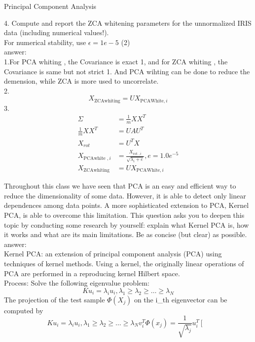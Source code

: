 \documentclass[
	ngerman,
     solution=true
	]{tudaexercise}
\begin{document}
\begin{task}{Principal Component Analysis}
\begin{subtask}[3e)]
4. Compute and report the ZCA whitening parameters for the unnormalized IRIS data (including numerical values!).\\
For numerical stability, use $\epsilon=1 e-5$ (2)\\[15pt]
answer:\\[15pt]
1.For PCA whiting , the Covariance is exact 1, and for ZCA whiting , the Covariance is same but not strict 1.
And PCA wihting can be done to reduce the demension, while ZCA is more used to uncorrelate.\\
2.
\[
X_{\text {ZCAwhiting}}=U X_{\text {PCAWhite}, i}
\]
3.
\[
\begin{aligned}
\Sigma &= \frac{1}{m} X X^{T}\\
\frac{1}{m} X X^{T} &=U A U^{T}\\
X_{r o t}&=U^{T} X \\
X_{\text {PCAwhite }, i} & =\frac{X_{\text {rot }, i}}{\sqrt{\lambda_{i}+e}}, e=1.0 e^{-5}\\
X_{\text {ZCAwhiting}}&=U X_{\text {PCAWhite}, i}
\end{aligned}
\]
\end{subtask}
\begin{subtask}[3f)]
Throughout this class we have seen that PCA is an easy and efficient way to reduce the dimensionality of
some data. However, it is able to detect only linear dependences among data points. A more sophisticated
extension to PCA, Kernel PCA, is able to overcome this limitation. This question asks you to deepen this topic
by conducting some research by yourself: explain what Kernel PCA is, how it works and what are its main
limitations. Be as concise (but clear) as possible.\\[15pt]
answer:\\[15pt]
Kernel PCA: an extension of principal component analysis (PCA) using techniques of kernel methods. Using a kernel, the originally linear operations of PCA are performed in a reproducing kernel Hilbert space.\\
Process: Solve the following eigenvalue problem:\\
\[
K u_{i}=\lambda_{i} u_{i}, \lambda_{1} \geq \lambda_{2} \geq \ldots \geq \lambda_{N}
\]
The projection of the test sample $\Phi (X_j)$ on the i\_th eigenvector can be computed by
\[
K u_{i}=\lambda_{i} u_{i}, \lambda_{1} \geq \lambda_{2} \geq \ldots \geq \lambda_{N}v_{i}^{T} \Phi\left(x_{j}\right)=\frac{1}{\sqrt{\lambda_{j}}} u_{i}^{T}\left[\begin{array}{c}

\end{array}\]
\end{subtask}
\end{task}
\end{document}

